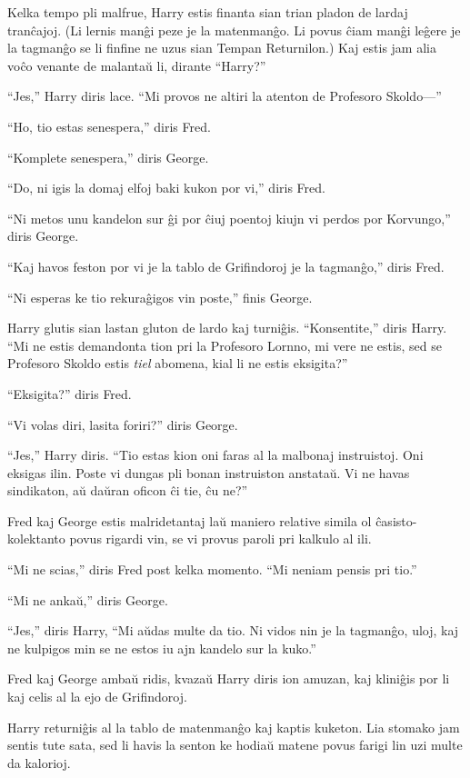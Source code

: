 Kelka tempo pli malfrue, Harry estis finanta sian trian pladon de
lardaj tranĉajoj. (Li lernis manĝi peze je la matenmanĝo. Li povus
ĉiam manĝi leĝere je la tagmanĝo se li finfine ne uzus sian Tempan
Returnilon.) Kaj estis jam alia voĉo venante de malantaŭ li, dirante
``Harry?''

``Jes,'' Harry diris lace. ``Mi provos ne altiri la atenton de
Profesoro Skoldo—''

``Ho, tio estas senespera,'' diris Fred.

``Komplete senespera,'' diris George.

``Do, ni igis la domaj elfoj baki kukon por vi,'' diris Fred.

``Ni metos unu kandelon sur ĝi por ĉiuj poentoj kiujn vi perdos por Korvungo,'' diris George.

``Kaj havos feston por vi je la tablo de Grifindoroj je la tagmanĝo,'' diris Fred.

``Ni esperas ke tio rekuraĝigos vin poste,'' finis George.

Harry glutis sian lastan gluton de lardo kaj turniĝis. ``Konsentite,''
diris Harry. ``Mi ne estis demandonta tion pri la Profesoro Lornno, mi
vere ne estis, sed se Profesoro Skoldo estis \emph{tiel} abomena, kial
li ne estis eksigita?''

``Eksigita?'' diris Fred.

``Vi volas diri, lasita foriri?'' diris George.

``Jes,'' Harry diris. ``Tio estas kion oni faras al la malbonaj
instruistoj. Oni eksigas ilin. Poste vi dungas pli bonan instruiston
anstataŭ. Vi ne havas sindikaton, aŭ daŭran oficon ĉi tie, ĉu ne?''

Fred kaj George estis malridetantaj laŭ maniero relative simila ol
ĉasisto-kolektanto povus rigardi vin, se vi provus paroli pri kalkulo
al ili.

``Mi ne scias,'' diris Fred post kelka momento. ``Mi neniam pensis pri tio.''

``Mi ne ankaŭ,'' diris George.

``Jes,'' diris Harry, ``Mi aŭdas multe da tio. Ni vidos nin je la
tagmanĝo, uloj, kaj ne kulpigos min se ne estos iu ajn kandelo sur la
kuko.''

Fred kaj George ambaŭ ridis, kvazaŭ Harry diris ion amuzan, kaj
kliniĝis por li kaj celis al la ejo de Grifindoroj.

Harry returniĝis al la tablo de matenmanĝo kaj kaptis kuketon. Lia
stomako jam sentis tute sata, sed li havis la senton ke hodiaŭ matene
povus farigi lin uzi multe da kalorioj.

